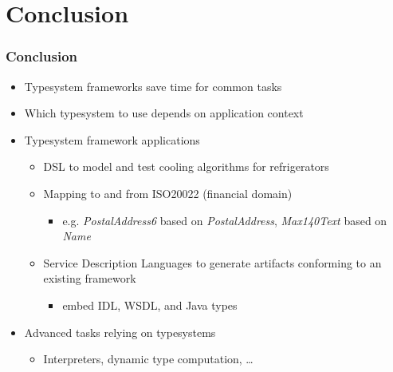 \section{Conclusion}

\begin{frame}
  \frametitle{Conclusion}
  
  \begin{itemize}
    \item Typesystem frameworks save time for common tasks
    \item Which typesystem to use depends on application context
    \item Typesystem framework applications
    \begin{itemize}
      \item DSL to model and test cooling algorithms for refrigerators 
      \item Mapping to and from ISO20022 (financial domain)
      \begin{itemize}
        \item e.g. \emph{PostalAddress6} based on \emph{PostalAddress},
        \emph{Max140Text} based on \emph{Name}
      \end{itemize}
      \item Service Description Languages to generate artifacts conforming
      to an existing framework
      \begin{itemize}
        \item embed IDL, WSDL, and Java types
      \end{itemize}
    \end{itemize}
    \item Advanced tasks relying on typesystems
    \begin{itemize}
      \item Interpreters, dynamic type computation, \ldots
    \end{itemize}
  \end{itemize}
\end{frame}

